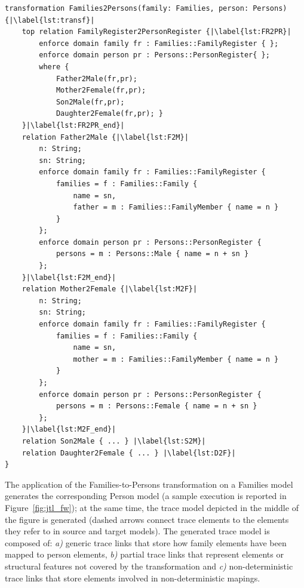 \begin{lstlisting}[label={lst:jtl}, float=*t, language=jtl, escapechar=|, caption={The Families-to-Persons bidirectional transformation in JTL}]
transformation Families2Persons(family: Families, person: Persons) {|\label{lst:transf}|
	top relation FamilyRegister2PersonRegister {|\label{lst:FR2PR}|
		enforce domain family fr : Families::FamilyRegister { };
		enforce domain person pr : Persons::PersonRegister{ };
		where {
			Father2Male(fr,pr);
			Mother2Female(fr,pr);
			Son2Male(fr,pr);
			Daughter2Female(fr,pr); }
	}|\label{lst:FR2PR_end}|	
	relation Father2Male {|\label{lst:F2M}|
		n: String;
		sn: String;
		enforce domain family fr : Families::FamilyRegister {
			families = f : Families::Family {
				name = sn,
				father = m : Families::FamilyMember { name = n }
			}
		};
		enforce domain person pr : Persons::PersonRegister {
			persons = m : Persons::Male { name = n + sn	}
		};
	}|\label{lst:F2M_end}|	
	relation Mother2Female {|\label{lst:M2F}|
		n: String;
		sn: String;
		enforce domain family fr : Families::FamilyRegister {
			families = f : Families::Family {
				name = sn,
				mother = m : Families::FamilyMember { name = n }
			}
		};
		enforce domain person pr : Persons::PersonRegister {
			persons = m : Persons::Female {	name = n + sn }
		};
	}|\label{lst:M2F_end}| 	
	relation Son2Male { ... } |\label{lst:S2M}| 
	relation Daughter2Female { ... } |\label{lst:D2F}| 
}
\end{lstlisting}


The application of the Families-to-Persons transformation on a Families model generates the corresponding Person model (a sample execution is reported in Figure~\ref{fig:jtl_fw}); at the same time, the trace model depicted in the middle of the figure is generated (dashed arrows connect trace elements to the elements they refer to in source and target models). The generated trace model is composed of: 
\emph{a)} generic trace links %
that store how family elements have been mapped to person elements,
\emph{b)} partial trace links that represent elements or structural features not covered by the transformation and \emph{c)} non-deterministic trace links that store elements involved in non-deterministic mapings.


